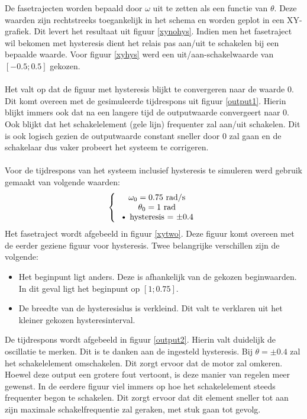 \documentclass[12pt]{article}
\begin{document}
\newpage
\noindent De fasetrajecten worden bepaald door $\omega$ uit te zetten als een functie van $\theta$. Deze waarden zijn rechtstreeks toegankelijk in het schema en worden geplot in een XY-grafiek. Dit levert het resultaat uit figuur \ref{xynohys}. Indien men het fasetraject wil bekomen met hysteresis dient het relais pas aan/uit te schakelen bij een bepaalde waarde. Voor figuur \ref{xyhys} werd een uit/aan-schakelwaarde van $[-0.5;0.5]$ gekozen. \\ \\
Het valt op dat de figuur met hysteresis blijkt te convergeren naar de waarde 0. Dit komt overeen met de gesimuleerde tijdrespons uit figuur \ref{output1}. Hierin blijkt immers ook dat na een langere tijd de outputwaarde convergeert naar 0. Ook blijkt dat het schakelelement (gele lijn) frequenter zal aan/uit schakelen. Dit is ook logisch gezien de outputwaarde constant sneller door 0 zal gaan en de schakelaar dus vaker probeert het systeem te corrigeren. \\ \\
Voor de tijdrespons van het systeem inclusief hysteresis te simuleren werd gebruik gemaakt van volgende waarden:
\[ 
\left \{
  \begin{tabular}{c}
  $\omega_0 = 0.75$ rad/s \\
  $\theta_0 = 1$ rad \\•
  hysteresis = $\pm 0.4$
  \end{tabular}
\right. 
\]
Het fasetraject wordt afgebeeld in figuur \ref{xytwo}. Deze figuur komt overeen met de eerder geziene figuur voor hysteresis. Twee belangrijke verschillen zijn de volgende:
\begin{itemize}
	\item Het beginpunt ligt anders. Deze is afhankelijk van de gekozen beginwaarden. In dit geval ligt het beginpunt op $[1;0.75]$. 
	\item De breedte van de hysteresislus is verkleind. Dit valt te verklaren uit het kleiner gekozen hysteresinterval.
\end{itemize}
De tijdrespons wordt afgebeeld in figuur \ref{output2}. Hierin valt duidelijk de oscillatie te merken. Dit is te danken aan de ingesteld hysteresis. Bij $\theta = \pm 0.4$ zal het schakelelement omschakelen. Dit zorgt ervoor dat de motor zal omkeren. Hoewel deze output een grotere fout vertoont, is deze manier van regelen meer gewenst. In de eerdere figuur viel immers op hoe het schakelelement steeds frequenter begon te schakelen. Dit zorgt ervoor dat dit element sneller tot aan zijn maximale schakelfrequentie zal geraken, met stuk gaan tot gevolg. 
\end{document}
